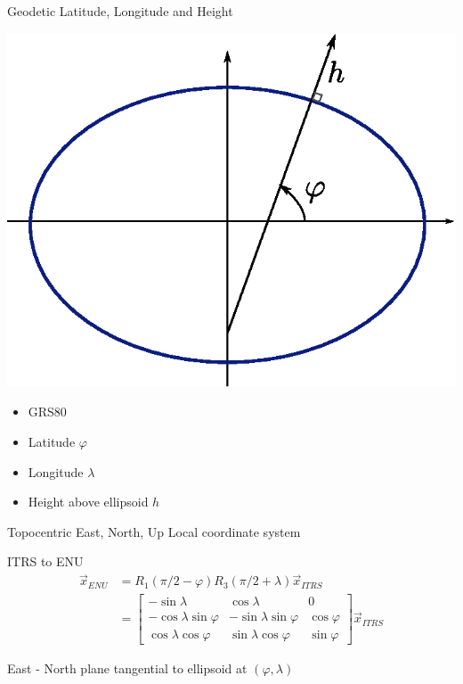 \documentclass[14pt,table,t, c]{beamer}
\begin{document}
\begin{frame}{Geodetic Latitude, Longitude and Height}
\begin{minipage}[t][][c]{0.48\linewidth}
	\includegraphics[width=\linewidth]{figure/latitude}
\end{minipage}
\begin{minipage}[t][][c]{0.5\linewidth}
\begin{itemize}
\item GRS80
\item Latitude $\varphi$
\item Longitude $\lambda$
\item Height above ellipsoid $h$
\end{itemize}
\end{minipage}
\end{frame}

\begin{frame}{Topocentric East, North, Up}
Local coordinate system
\begin{block}{ITRS to ENU}
\vspace*{-\baselineskip}\setlength\belowdisplayskip{0pt}\setlength\abovedisplayskip{0pt}
\begin{align*}
\vec{x}_{ENU} &= R_1(\pi/2 - \varphi)R_3(\pi/2 + \lambda) \vec{x}_{ITRS} \\ 
              &= \begin{bmatrix}
                    - \sin\lambda            &   \cos\lambda            & 0 \\
                    - \cos\lambda\sin\varphi & - \sin\lambda\sin\varphi & \cos\varphi \\
                      \cos\lambda\cos\varphi &   \sin\lambda\cos\varphi & \sin\varphi
                 \end{bmatrix}
                 \vec{x}_{ITRS}
\end{align*}
\end{block}
\vfill
East - North plane tangential to ellipsoid at $(\varphi,\lambda)$
\end{frame}
\end{document}
